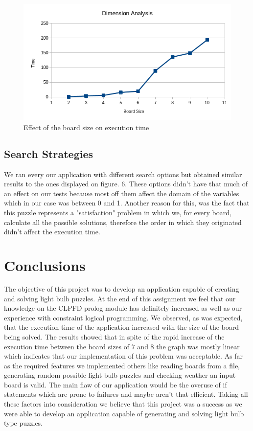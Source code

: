 \documentclass[runningheads]{llncs}
\begin{document}
\begin{figure}
	\includegraphics[scale=0.5]{graph}
	\centering
	\caption{Effect of the board size on execution time}
	\centering
\end{figure}

\subsection{Search Strategies}
We ran every our application with different search options but obtained similar results to the ones displayed on figure. 6. These options didn't have that much of an effect on our tests because most off them affect the domain of the variables which in our case was between 0 and 1. Another reason for this, was the fact that this puzzle represents a "satisfaction" problem in which we, for every board, calculate all the possible solutions, therefore the order in which they originated didn't affect the execution time.

\clearpage
\section{Conclusions}
The objective of this project was to develop an application capable of creating and solving light bulb puzzles. At the end of this assignment we feel that our knowledge on the CLPFD prolog module has definitely increased as well as our experience with constraint logical programming. \hfill \break
We observed, as was expected, that the execution time of the application increased with the size of the board being solved.
The results showed that in spite of the rapid increase of the execution time between the board sizes of 7 and 8 the graph was mostly linear which indicates that our implementation of this problem was acceptable. \hfill \break
As far as the required features we implemented others like reading boards from a file, generating random possible light bulb puzzles and checking weather an input board is valid.
The main flaw of our application would be the overuse of if statements which are prone to failures and maybe aren't that efficient. \hfill \break
Taking all these factors into consideration we believe that this project was a success as we were able to develop an application capable of generating and solving light bulb type puzzles.
\end{document}
